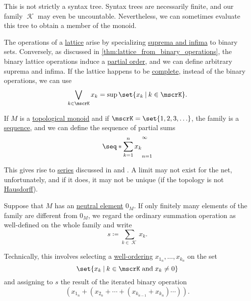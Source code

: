 \begin{remark}
\begin{thmenum}
    This is not strictly a syntax tree. Syntax trees are necessarily finite, and our family \( \mscrK \) may even be uncountable. Nevertheless, we can sometimes evaluate this tree to obtain a member of the monoid.
    \begin{thmenum}
       The operations of a \hyperref[def:lattice]{lattice} arise by specializing \hyperref[def:extremal_points/supremum_and_infimum]{suprema and infima} to binary sets. Conversely, as discussed in \cref{thm:lattice_from_binary_operations}, the binary lattice operations induce a \hyperref[def:partially_ordered_set]{partial order}, and we can define arbitrary suprema and infima. If the lattice happens to be \hyperref[def:complete_lattice]{complete}, instead of the binary operations, we can use
      \begin{equation*}
        \bigvee_{k \in \mscrK} x_k = \sup\set{ x_k \given k \in \mscrK }.
      \end{equation*}

       If \( M \) is a \hyperref[rem:topological_first_order_structures]{topological monoid} and if \( \mscrK = \set{ 1, 2, 3, \ldots } \), the family is a \hyperref[def:sequence]{sequence}, and we can define the sequence of partial sums
      \begin{equation*}
        \seq*{ \sum_{k=1}^n x_k }_{n=1}^\infty
      \end{equation*}

      This gives rise to \hyperref[def:convergent_series]{series} discussed in  and . A limit may not exist for the net, unfortunately, and if it does, it may not be unique (if the topology is not \hyperref[def:separation_axioms/T2]{Hausdorff}).

       Suppose that \( M \) has an \hyperref[def:monoid]{neutral element} \( 0_M \). If only finitely many elements of the family are different from \( 0_M \), we regard the ordinary summation operation as well-defined on the whole family and write
      \begin{equation*}
        s \coloneqq \sum_{k \in \mscrK} x_k.
      \end{equation*}

      Technically, this involves selecting a \hyperref[def:well_ordered_set]{well-ordering} \( x_{1_n}, \ldots, x_{k_n} \) on the set
      \begin{equation*}
        \set{ x_k \given k \in \mscrK \T{and} x_k \neq 0 }
      \end{equation*}
      and assigning to \( s \) the result of the iterated binary operation
      \begin{equation*}
        (x_{1_n} + (x_{2_n} + \cdots + (x_{k_{n-1}} + x_{k_n}) \cdots)).
      \end{equation*}


\end{thmenum}
\end{thmenum}
\end{remark}
